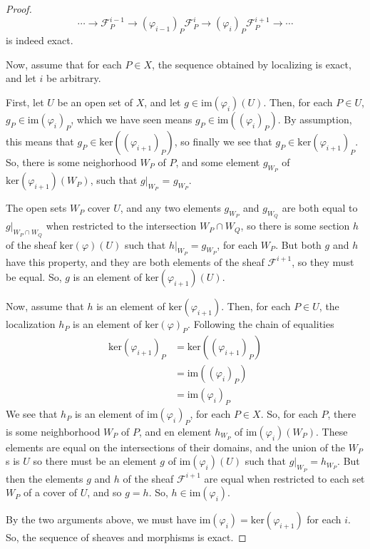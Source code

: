\documentclass[12pt]{article}
\theoremstyle{definition}
\newenvironment{problem}[2][Problem]{\begin{trivlist}
\item[\hskip \labelsep {\bfseries #1}\hskip \labelsep {\bfseries #2.}]}{\end{trivlist}}
\begin{document}
\begin{problem}{2}
\begin{enumerate}[label=(\alph*)]
\begin{proof}
        \[
        \cdots \to \mathcal F_P^{i-1} \rightarrow{(\varphi_{i-1})_P} \mathcal F_P^i \rightarrow{(\varphi_i)_P} \mathcal F_P^{i+1} \to \cdots
        \]
        is indeed exact.
        \par Now, assume that for each $P \in X$, the sequence obtained by localizing is exact, and let $i$ be arbitrary. 
        \par First, let $U$ be an open set of $X$, and let $g \in \text{im}(\varphi_i)(U)$. Then, for each $P \in U$, $g_P \in \text{im}(\varphi_i)_P$, which we have seen means $g_P \in \text{im}((\varphi_i)_P)$. By assumption, this means that $g_P \in \text{ker}((\varphi_{i+1})_P)$, so finally we see that $g_P \in \text{ker}(\varphi_{i+1})_P$. So, there is some neighorhood $W_P$ of $P$, and some element $g_{W_P}$ of $\text{ker}(\varphi_{i+1})(W_P)$, such that $g\lvert_{W_P}$ = $g_{W_P}$.
        \par The open sets $W_P$ cover $U$, and any two elements $g_{W_P}$ and $g_{W_Q}$ are both equal to $g\lvert_{W_P \cap W_Q}$ when restricted to the intersection $W_P \cap W_Q$, so there is some section $h$ of the sheaf $\text{ker}(\varphi)(U)$ such that $h\lvert_{W_P} = g_{W_P}$, for each $W_P$. But both $g$ and $h$ have this property, and they are both elements of the sheaf $\mathcal F^{i+1}$, so they must be equal. So, $g$ is an element of $\text{ker}(\varphi_{i+1})(U)$.
        \par Now, assume that $h$ is an element of $\text{ker}(\varphi_{i+1})$. Then, for each $P \in U$, the localization $h_P$ is an element of $\text{ker}(\varphi)_P$. Following the chain of equalities
        \begin{align*}
            \text{ker}(\varphi_{i+1})_P &=  \text{ker}((\varphi_{i+1})_P)\\
            &= \text{im}((\varphi_i)_P)\\
            &= \text{im}(\varphi_i)_P
        \end{align*}
        We see that $h_P$ is an element of $\text{im}(\varphi_i)_P$, for each $P \in X$. So, for each $P$, there is some neighborhood $W_P$ of $P$, and en element $h_{W_P}$ of $\text{im}(\varphi_i)(W_P)$. These elements are equal on the intersections of their domains, and the union of the $W_P$s is $U$ so there must be an element $g$ of $\text{im}(\varphi_i)(U)$ such that $g\lvert_{W_P} = h_{W_P}$. But then the elements $g$ and $h$ of the sheaf $\mathcal F^{i+1}$ are equal when restricted to each set $W_P$ of a cover of $U$, and so $g=h$. So, $h \in \text{im}(\varphi_i)$. 
        \par By the two arguments above, we must have $\text{im}(\varphi_i) = \text{ker}(\varphi_{i+1})$ for each $i$. So, the sequence of sheaves and morphisms is exact.
        \end{proof}
    \end{enumerate}
\end{problem}
\end{document}
